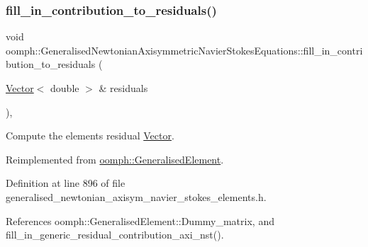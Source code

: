 \subsubsection{\texorpdfstring{fill\+\_\+in\+\_\+contribution\+\_\+to\+\_\+residuals()}{fill\_in\_contribution\_to\_residuals()}}
{\footnotesize\ttfamily void oomph\+::\+Generalised\+Newtonian\+Axisymmetric\+Navier\+Stokes\+Equations\+::fill\+\_\+in\+\_\+contribution\+\_\+to\+\_\+residuals (\begin{DoxyParamCaption}\item[{\hyperlink{classoomph_1_1Vector}{Vector}$<$ double $>$ \&}]{residuals }\end{DoxyParamCaption})\hspace{0.3cm}{\ttfamily [inline]}, {\ttfamily [virtual]}}



Compute the element\textquotesingle{}s residual \hyperlink{classoomph_1_1Vector}{Vector}. 



Reimplemented from \hyperlink{classoomph_1_1GeneralisedElement_a310c97f515e8504a48179c0e72c550d7}{oomph\+::\+Generalised\+Element}.



Definition at line 896 of file generalised\+\_\+newtonian\+\_\+axisym\+\_\+navier\+\_\+stokes\+\_\+elements.\+h.



References oomph\+::\+Generalised\+Element\+::\+Dummy\+\_\+matrix, and fill\+\_\+in\+\_\+generic\+\_\+residual\+\_\+contribution\+\_\+axi\+\_\+nst().

\mbox{\label{classoomph_1_1GeneralisedNewtonianAxisymmetricNavierStokesEquations_a162f23398b74cb7a99506c4f8f277811}} 
